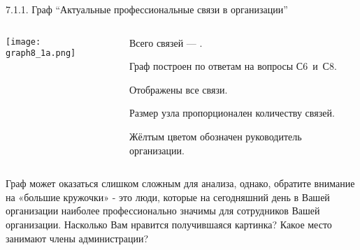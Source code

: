 \begin{frame}{7.1.1. Граф ``Актуальные профессиональные связи в организации''}

\begin{columns} 
\begin{column}{0.7\textwidth} 
\centering
          \texttt{[image: graph8\_1a.png]}
\end{column}
\begin{column}{0.25\textwidth} 

\tiny
Всего связей --- \valHAAlinks.
\smallskip

Граф построен по ответам на вопросы С6~и~С8.
\smallskip

\socioSizeComment
\smallskip

Отображены все связи. 
\smallskip

Размер узла пропорционален количеству связей.
\smallskip

Жёлтым цветом обозначен руководитель организации.

\end{column}
\end{columns}

\fontsize{6pt}{7}\selectfont
Граф может оказаться слишком сложным для анализа, однако, 
обратите внимание на «большие кружочки» - это люди, которые на сегодняшний день в Вашей организации наиболее 
профессионально значимы для сотрудников Вашей организации. Насколько Вам нравится получившаяся картинка? 
Какое место занимают члены администрации?

\end{frame}


